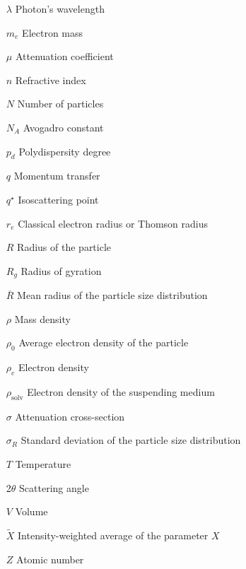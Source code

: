 \begin{itemize}
        \item[$\lambda$] Photon's wavelength  
        \item[$m_e$] Electron mass
        \item[$\mu$] Attenuation coefficient
        \item[$n$] Refractive index        
        \item[$N$] Number of particles
        \item[$N_A$] Avogadro constant
        \item[$p_d$] Polydispersity degree
        \item[$q$] Momentum transfer 
        \item[$q^{\star}$] Isoscattering point
        \item[$r_e$] Classical electron radius or Thomson radius         
        \item[$R$] Radius of the particle 
        \item[$R_g$] Radius of gyration 
        \item[$\overline{R}$] Mean radius of the particle size distribution
        \item[$\rho$] Mass density        
        \item[$\rho_0$] Average electron density of the particle
        \item[$\rho_e$] Electron density
        \item[$\rho_{\text{solv}}$] Electron density of the suspending medium
        \item[$\sigma$] Attenuation cross-section
        \item[$\sigma_R$] Standard deviation of the particle size distribution
        \item[$T$] Temperature  
        \item[2$\theta$] Scattering angle
        \item[$V$] Volume
        \item[$\tilde X$] Intensity-weighted average of the parameter $X$
        \item[$Z$] Atomic number

\end{itemize}

\cleardoublepage
